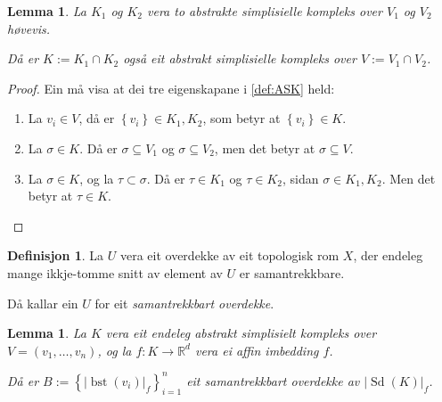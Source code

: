 \documentclass[a4paper, 12pt, norsk]{article}
\theoremstyle{plain}
\newtheorem{lemma}[theorem]{Lemma}
\theoremstyle{definition}
\newtheorem{definition}[theorem]{Definisjon}
\newcommand{\Rb}{\mathbb{R}}
\newcommand{\intersect}{ \mathop{\cap}\limits }
\newcommand{\gr}[1]{ \lvert #1 \rvert } %
\newcommand{\set}[1]{ \left\{ #1 \right\} } %
\DeclareMathOperator{\Sd}{Sd} %
\DeclareMathOperator{\bst}{bst} %
\begin{document}
\begin{lemma} \label{thm:snitt-av-ASK-er-ASK}
	La \( K_1 \) og \( K_2 \) vera to abstrakte simplisielle kompleks over \( V_1 \) og \( V_2 \) høvevis. 
	
	Då er \( K := K_1 \intersect K_2 \) også eit abstrakt simplisielle kompleks over \( V := V_1 \intersect V_2 \).
\end{lemma}

\begin{proof}
	Ein må visa at dei tre eigenskapane i \autoref{def:ASK} held:
	\begin{enumerate}
		\item La \( v_i \in V \), då er \( \set{v_i} \in K_1, K_2 \), som betyr at \( \set{v_i} \in K \).
  		\item La \( \sigma \in K \). Då er \( \sigma \subseteq V_1 \) og \( \sigma \subseteq V_2 \), men det betyr at \( \sigma \subseteq V \).
    	\item La \( \sigma \in K \), og la \( \tau \subset \sigma \). Då er \( \tau \in K_1 \) og \( \tau \in K_2 \), sidan \( \sigma \in K_1, K_2 \). Men det betyr at \( \tau \in K \).
	\end{enumerate}
\end{proof}

\begin{definition}
	La \( U \) vera eit overdekke av eit topologisk rom \( X \), der endeleg mange ikkje-tomme snitt av element av \( U \) er samantrekkbare. 
	
	Då kallar ein \( U \) for eit \emph{samantrekkbart overdekke}.
\end{definition}

\begin{lemma} \label{thm:bst-good}
	La \( K \) vera eit endeleg abstrakt simplisielt kompleks over \( V = (v_1, \dots, v_n) \), og la \( f: K \to \Rb^d \) vera ei affin imbedding \( f \). 
	
	Då er \( B := \set{\gr{\bst(v_i)}_f}_{i=1}^{n} \) eit samantrekkbart overdekke av \( \gr{\Sd(K)}_f \).
\end{lemma}
\end{document}
